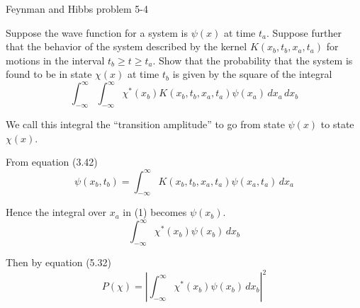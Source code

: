 \documentclass[12pt]{article}
\begin{document}
\begin{center}
Feynman and Hibbs problem 5-4
\end{center}

Suppose the wave function for a system is $\psi(x)$ at time $t_a$.
Suppose further that the behavior of the system described by
the kernel $K(x_b,t_b,x_a,t_a)$ for motions in the interval
$t_b\ge t\ge t_a$.
Show that the probability that the system is found to be in state
$\chi(x)$ at time $t_b$ is given by the square of the integral
\begin{equation*}
\int_{-\infty}^\infty\int_{-\infty}^\infty
\chi^*(x_b)
K(x_b,t_b,x_a,t_a)
\psi(x_a)
\,dx_a\,dx_b
\tag{1}
\end{equation*}

We call this integral the ``transition amplitude'' to go from
state $\psi(x)$ to state $\chi(x)$.

\bigskip
From equation (3.42)
\begin{equation*}
\psi(x_b,t_b)=\int_{-\infty}^\infty
K(x_b,t_b,x_a,t_a)
\psi(x_a,t_a)
\,dx_a
\end{equation*}

Hence the integral over $x_a$ in (1) becomes $\psi(x_b)$.
\begin{equation*}
\int_{-\infty}^\infty
\chi^*(x_b)
\psi(x_b)
\,dx_b
\end{equation*}

Then by equation (5.32)
\begin{equation*}
P(\chi)=\left|
\int_{-\infty}^\infty
\chi^*(x_b)
\psi(x_b)
\,dx_b
\right|^2
\end{equation*}
\end{document}

